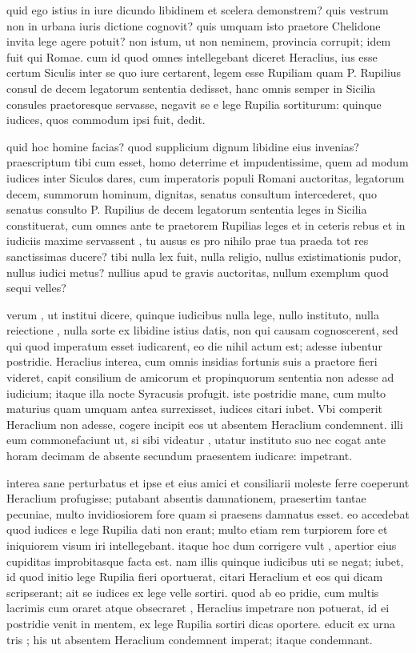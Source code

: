  quid ego istius in iure dicundo libidinem et scelera demonstrem? quis vestrum non in urbana iuris dictione cognovit? quis umquam isto praetore Chelidone invita lege agere potuit? non istum, ut non neminem, provincia corrupit; idem fuit qui Romae. cum id quod omnes intellegebant diceret Heraclius, ius esse certum Siculis inter se quo iure certarent, legem esse Rupiliam quam P. Rupilius consul de decem legatorum sententia dedisset, hanc omnis semper in Sicilia consules praetoresque servasse, negavit se e lege Rupilia sortiturum: quinque iudices, quos commodum ipsi fuit, dedit.

 quid hoc homine facias? quod supplicium dignum libidine eius invenias? praescriptum tibi cum esset, homo deterrime et impudentissime, quem ad modum iudices inter Siculos dares, cum imperatoris populi Romani auctoritas, legatorum decem, summorum hominum, dignitas, senatus consultum intercederet, quo senatus consulto P. Rupilius de decem legatorum sententia leges in Sicilia constituerat, cum omnes ante te praetorem Rupilias leges et in ceteris rebus et in iudiciis maxime servassent , tu ausus es pro nihilo prae tua praeda tot res sanctissimas ducere? tibi nulla lex fuit, nulla religio, nullus existimationis pudor, nullus iudici metus? nullius apud te gravis auctoritas, nullum exemplum quod sequi velles?

 verum , ut institui dicere, quinque iudicibus nulla lege, nullo instituto, nulla reiectione , nulla sorte ex libidine istius datis, non qui causam cognoscerent, sed qui quod imperatum esset iudicarent, eo die nihil actum est; adesse iubentur postridie. Heraclius interea, cum omnis insidias fortunis suis a praetore fieri videret, capit consilium de amicorum et propinquorum sententia non adesse ad iudicium; itaque illa nocte Syracusis profugit. iste postridie mane, cum multo maturius quam umquam antea surrexisset, iudices citari iubet. Vbi comperit Heraclium non adesse, cogere incipit eos ut absentem Heraclium condemnent. illi eum commonefaciunt ut, si sibi videatur , utatur instituto suo nec cogat ante horam decimam de absente secundum praesentem iudicare: impetrant.

 interea sane perturbatus et ipse et eius amici et consiliarii moleste ferre coeperunt Heraclium profugisse; putabant absentis damnationem, praesertim tantae pecuniae, multo invidiosiorem fore quam si praesens damnatus esset. eo accedebat quod iudices e lege Rupilia dati non erant; multo etiam rem turpiorem fore et iniquiorem visum iri intellegebant. itaque hoc dum corrigere vult , apertior eius cupiditas improbitasque facta est. nam illis quinque iudicibus uti se negat; iubet, id quod initio lege Rupilia fieri oportuerat, citari Heraclium et eos qui dicam scripserant; ait se iudices ex lege velle sortiri. quod ab eo pridie, cum multis lacrimis cum oraret atque obsecraret , Heraclius impetrare non potuerat, id ei postridie venit in mentem, ex lege Rupilia sortiri dicas oportere. educit ex urna tris ; his ut absentem Heraclium condemnent imperat; itaque condemnant.

